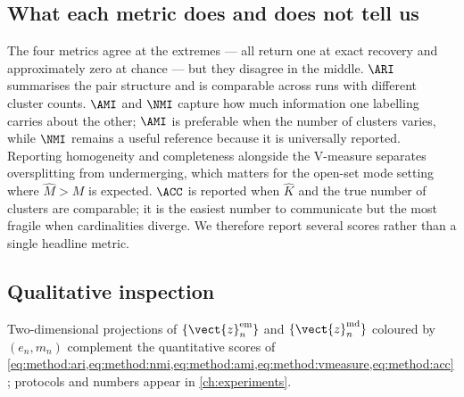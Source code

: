 \subsection*{What each metric does and does not tell us}

The four metrics agree at the extremes --- all return one at exact recovery and approximately zero at chance --- but they disagree in the middle.
$\ARI$ summarises the pair structure and is comparable across runs with different cluster counts.
$\AMI$ and $\NMI$ capture how much information one labelling carries about the other; $\AMI$ is preferable when the number of clusters varies, while $\NMI$ remains a useful reference because it is universally reported.
Reporting homogeneity and completeness alongside the V-measure separates oversplitting from undermerging, which matters for the open-set mode setting where $\hat{M}>M$ is expected.
$\ACC$ is reported when $\hat{K}$ and the true number of clusters are comparable; it is the easiest number to communicate but the most fragile when cardinalities diverge.
We therefore report several scores rather than a single headline metric.

\subsection*{Qualitative inspection}

Two-dimensional projections of $\{\vect{z}^{\mathrm{em}}_n\}$ and $\{\vect{z}^{\mathrm{md}}_n\}$ coloured by $(e_n,m_n)$ complement the quantitative scores of \cref{eq:method:ari,eq:method:nmi,eq:method:ami,eq:method:vmeasure,eq:method:acc}; protocols and numbers appear in \cref{ch:experiments}.

